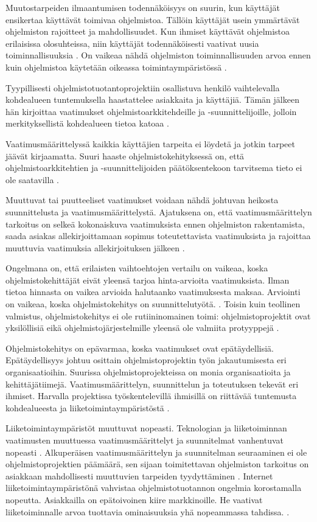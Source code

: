 \documentclass[finnish]{tktltiki2}
\theoremstyle{definition}
\theoremstyle{remark}
\begin{document}
Muutostarpeiden ilmaantumisen todennäköisyys on suurin, kun käyttäjät ensikertaa käyttävät toimivaa ohjelmistoa. Tällöin käyttäjät usein ymmärtävät ohjelmiston rajoitteet ja mahdollisuudet. Kun ihmiset käyttävät ohjelmistoa erilaisissa olosuhteissa, niin käyttäjät todennäköisesti vaativat uusia toiminnallisuuksia \cite{KES95}. On vaikeaa nähdä ohjelmiston toiminnallisuuden arvoa ennen kuin ohjelmistoa käytetään oikeassa toimintaympäristössä \cite{FOW01a}.

Tyypillisesti ohjelmistotuotantoprojektiin osallistuva henkilö vaihtelevalla kohdealueen tuntemuksella haastattelee asiakkaita ja käyttäjiä. Tämän jälkeen hän kirjoittaa vaatimukset ohjelmistoarkkitehdeille ja -suunnittelijoille, jolloin merkityksellistä kohdealueen tietoa katoaa \cite{KES95}.

Vaatimusmäärittelyssä kaikkia käyttäjien tarpeita ei löydetä ja jotkin tarpeet jäävät kirjaamatta. Suuri haaste ohjelmistokehityksessä on, että ohjelmistoarkkitehtien ja -suunnittelijoiden päätöksentekoon tarvitsema tieto ei ole saatavilla \cite{KES95}.  

Muuttuvat tai puutteeliset vaatimukset voidaan nähdä johtuvan heikosta suunnittelusta ja vaatimusmäärittelystä. Ajatuksena on, että vaatimusmäärittelyn tarkoitus on selkeä kokonaiskuva vaatimuksista ennen ohjelmiston rakentamista, saada asiakas allekirjoittamaan sopimus toteutettavista vaatimuksista ja rajoittaa muuttuvia vaatimuksia allekirjoituksen jälkeen \cite{FOW01a}.

Ongelmana on, että erilaisten vaihtoehtojen vertailu on vaikeaa, koska ohjelmistokehittäjät eivät yleensä tarjoa hinta-arvioita vaatimuksista. Ilman tietoa hinnasta on vaikea arvioida halutaanko vaatimuksesta maksaa. Arviointi on vaikeaa, koska ohjelmistokehitys on suunnittelutyötä. \cite{FOW01a}. Toisin kuin teollinen valmistus, ohjelmistokehitys ei ole rutiininomainen toimi: ohjelmistoprojektit ovat yksilöllisiä eikä ohjelmistojärjestelmille yleensä ole valmiita protyyppejä \cite{KES95}.

Ohjelmistokehitys on epävarmaa, koska vaatimukset ovat epätäydellisiä. Epätäydellisyys johtuu osittain ohjelmistoprojektin työn jakautumisesta eri organisaatioihin.
Suurissa ohjelmistoprojekteissa on monia organisaatioita ja kehittäjätiimejä. Vaatimusmäärittelyn, suunnittelun ja toteutuksen tekevät eri ihmiset. Harvalla projektissa työskentelevillä ihmisillä on riittävää tuntemusta kohdealueesta ja liiketoimintaympäristöstä \cite{KES95}.

Liiketoimintaympäristöt muuttuvat nopeasti. Teknologian ja liiketoiminnan vaatimusten muuttuessa vaatimusmäärittelyt ja suunnitelmat vanhentuvat nopeasti \cite{WIC03}. Alkuperäisen vaatimusmäärittelyn ja suunnitelman seuraaminen ei ole ohjelmistoprojektien päämäärä, sen sijaan toimitettavan ohjelmiston tarkoitus on asiakkaan mahdollisesti muuttuvien tarpeiden tyydyttäminen \cite{HIC01}. Internet liiketoimintaympäristönä vahvistaa ohjelmistotuotannon ongelmia korostamalla nopeutta. Asiakkailla on epätoivoinen kiire markkinoille. He vaativat liiketoiminnalle arvoa tuottavia ominaisuuksia yhä nopeammassa tahdissa. \cite{BRL03}.
\end{document}
